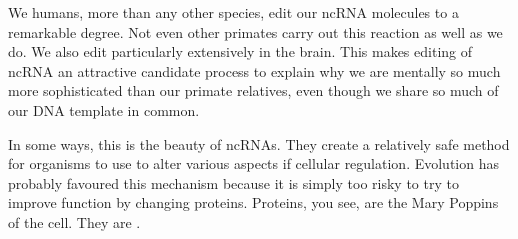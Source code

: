 We humans, more than any other species, edit our ncRNA molecules to a remarkable
degree. Not even other primates carry out this reaction as well as we do. We also
edit particularly extensively in the brain. This makes editing of ncRNA an
attractive candidate process to explain why we are mentally so much more
sophisticated than our primate relatives, even though we share so much of our DNA
template in common.

In some ways, this is the beauty of ncRNAs. They create a relatively safe method
for organisms to use to alter various aspects if cellular regulation. Evolution
has probably favoured this mechanism because it is simply too risky to try to
improve function by changing proteins. Proteins, you see, are the Mary Poppins of
the cell. They are .
